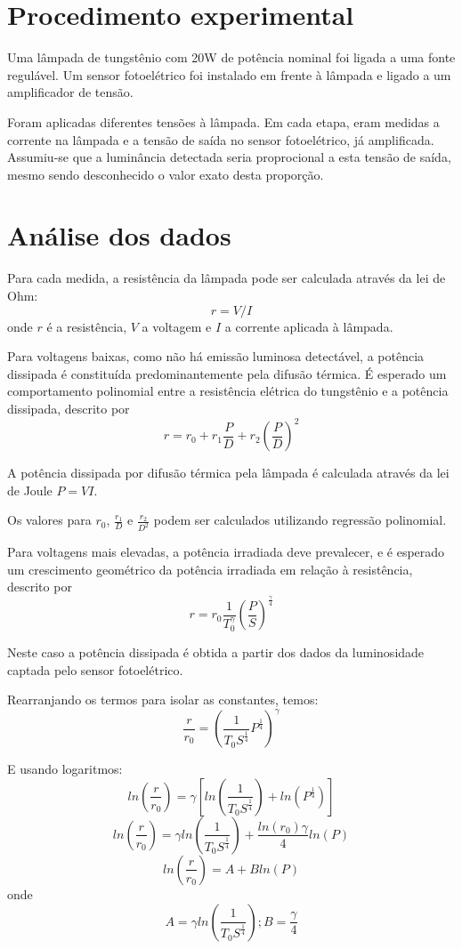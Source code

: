 \documentclass[brazilian,12pt,a4paper,final]{article}
\begin{document}
\section{Procedimento experimental}
Uma lâmpada de tungstênio com 20W de potência nominal foi ligada a uma fonte regulável. 
Um sensor fotoelétrico foi instalado em frente à lâmpada e ligado a um amplificador de tensão.

Foram aplicadas diferentes tensões à lâmpada.
Em cada etapa, eram medidas a corrente na lâmpada e a tensão de saída no sensor fotoelétrico, já amplificada.
Assumiu-se que a luminância detectada seria proprocional a esta tensão de saída, mesmo sendo desconhecido o valor exato desta proporção.

\section{Análise dos dados}
Para cada medida, 
a resistência da lâmpada pode ser calculada 
através da lei de Ohm: 
$$ r=V/I$$ 
onde $r$ é a resistência, $V$ a voltagem e $I$ a corrente aplicada à lâmpada. 

Para voltagens baixas,
como não há emissão luminosa detectável, 
a potência dissipada é constituída predominantemente
pela difusão térmica.
É esperado um comportamento polinomial entre a 
resistência elétrica do tungstênio e a potência dissipada, descrito por
$$r=r_0+r_1\frac{P}{D}+r_2(\frac{P}{D})^2$$

A potência dissipada por difusão térmica pela lâmpada é calculada através da 
lei de Joule $ P=VI $.

Os valores para $r_0$, $\frac{r_1}{D}$ e $\frac{r_2}{D^2}$
podem ser calculados
utilizando regressão polinomial.

Para voltagens mais elevadas, 
a potência irradiada deve prevalecer, e
é esperado um crescimento geométrico da 
potência irradiada em relação à resistência, descrito por
$$r=r_0\frac{1}{T_0^\gamma}(\frac{P}{S})^\frac{\gamma}{4}$$

Neste caso a potência dissipada é obtida a partir dos dados da luminosidade captada
pelo sensor fotoelétrico.

Rearranjando os termos para isolar as constantes, temos:
$$\frac{r}{r_0}=(\frac{1}{T_0S^\frac{1}{4}}P^\frac{1}{4})^\gamma$$

E usando logaritmos:
$$ln(\frac{r}{r_0})=\gamma[ln(\frac{1}{T_0S^\frac{1}{4}})+ln(P^\frac{1}{4})]$$
$$ln(\frac{r}{r_0})=\gamma ln(\frac{1}{T_0S^\frac{1}{4}})+\frac{ln(r_0)\gamma}{4}ln(P)$$
$$ln(\frac{r}{r_0})=A+Bln(P)$$
onde
$$A=\gamma ln(\frac{1}{T_0S^\frac{1}{4}}); B=\frac{\gamma}{4}$$
\end{document}
